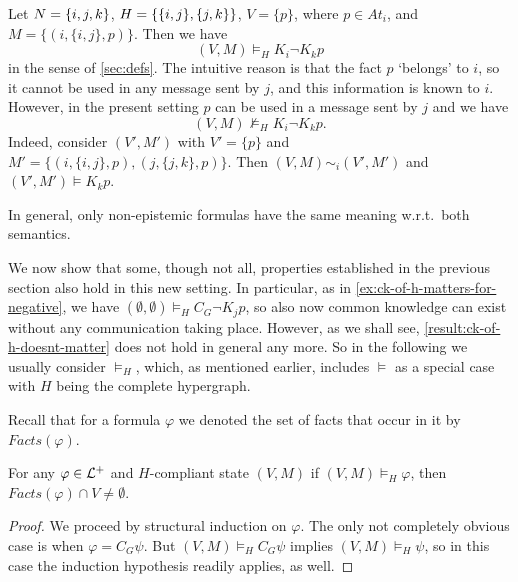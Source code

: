 \documentclass{article}
\newcounter{#1}
\newcommand{\ES}{\mbox{$\emptyset$}}
\newcommand{\state}[1][]{\ensuremath{(V#1,M#1)}\xspace}
\newcommand{\knows}[1]{\ensuremath{K_{#1}}\xspace}
\newcommand{\ck}[1]{\ensuremath{C_{#1}}\xspace}\newcommand{\Facts}{\mathit{Facts}}
\renewcommand{\enspace}{}
\begin{document}
\begin{example}
  \label{ex:semantics-different}
  Let $N = \mbox{$\{{i,j,k}\}$}$, $H =
  \{\mbox{$\{{i,j}\}$}, \mbox{$\{{j,k}\}$}\}$, $V = \{p\}$, where $p \in At_i$, and $M =
  \{(i,\{i,j\},p)\}$.  Then we have
  \[
  \state \vDash_H \knows i \neg \knows k p
  \]
  in the sense of \cref{sec:defs}. The intuitive reason is that the fact
  $p$ `belongs' to $i$, so it cannot be used in any message sent by $j$,
  and this information is known to $i$.  However, in the present setting
  $p$ can be used in a message sent by $j$ and we have
  \[
  \state \nvDash_H \knows i \neg \knows k p\enspace.
  \]
  Indeed, consider $(V',M')$ with $V' = \{p\}$ and $M' = \{(i,\{i,j\},p),(j,\{j,k\},p)\}$.
  Then $(V, M) \sim_i (V', M')$ and $(V', M') \vDash \knows k p$.
\end{example}
In general, only non-epistemic formulas have
the same meaning w.r.t.~both semantics.

We now show that some, though not all, properties
established in the previous section also hold in this new setting.
In particular, as in \cref{ex:ck-of-h-matters-for-negative}, we have
$(\ES, \ES) \vDash_H\ck G\neg \knows jp$, so
also now common knowledge can exist without any communication
taking place.
However, as we shall see, \cref{result:ck-of-h-doesnt-matter} does not
hold in general any more.
So in the following we usually consider $\vDash_H$, which, as
mentioned earlier,
includes $\vDash$ as a special case with $H$ being the complete hypergraph.





















Recall that for a formula $\varphi$ we denoted the set of facts that occur in it by $Facts(\varphi)$.

\begin{lemma}\label{lem:f}
For any $\varphi \in {\cal L}^+$ and $H$-compliant state $\state$ if $(V,M) \vDash_H \varphi$, then $Facts(\varphi) \cap V \neq \ES$.
\end{lemma}
\begin{proof}
We proceed by structural induction on $\varphi$.
  The only not completely obvious case is when
  $\varphi=\ck G\psi$. But $(V,M) \vDash_H \ck G\psi$ implies $(V,M) \vDash_H \psi$, so in this case the induction hypothesis
readily applies, as well.
\end{proof}
\end{document}
